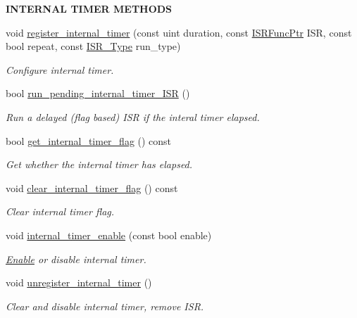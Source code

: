 \begin{Indent}{\bf I\+N\+T\+E\+R\+N\+AL T\+I\+M\+ER M\+E\+T\+H\+O\+DS}\par
\begin{DoxyCompactItemize}
\item 
void \hyperlink{class_loom___interrupt___manager_a61330d0a7d555fd77f0ecfa9e8d2d68e}{register\+\_\+internal\+\_\+timer} (const uint duration, const \hyperlink{_interrupt___manager_8h_a21adc8a9b6cc2505b5b1317ca9f74cf3}{I\+S\+R\+Func\+Ptr} I\+SR, const bool repeat, const \hyperlink{_interrupt___manager_8h_a1cb40265e710cbdf07f99beb6c4020d1}{I\+S\+R\+\_\+\+Type} run\+\_\+type)
\begin{DoxyCompactList}\small\item\em Configure internal timer. \end{DoxyCompactList}\item 
bool \hyperlink{class_loom___interrupt___manager_a62c7686cecf790cfa0b05b704dd331b7}{run\+\_\+pending\+\_\+internal\+\_\+timer\+\_\+\+I\+SR} ()
\begin{DoxyCompactList}\small\item\em Run a delayed (flag based) I\+SR if the interal timer elapsed. \end{DoxyCompactList}\item 
bool \hyperlink{class_loom___interrupt___manager_a0dce3fcaa0a20ebb67e6ff723cf6ac3d}{get\+\_\+internal\+\_\+timer\+\_\+flag} () const 
\begin{DoxyCompactList}\small\item\em Get whether the internal timer has elapsed. \end{DoxyCompactList}\item 
void \hyperlink{class_loom___interrupt___manager_acd8fc9dcdf5711155cde0b1ac6a3da15}{clear\+\_\+internal\+\_\+timer\+\_\+flag} () const 
\begin{DoxyCompactList}\small\item\em Clear internal timer flag. \end{DoxyCompactList}\item 
void \hyperlink{class_loom___interrupt___manager_a1264d1fc1bbb0d8c82e791d174e37007}{internal\+\_\+timer\+\_\+enable} (const bool enable)
\begin{DoxyCompactList}\small\item\em \hyperlink{namespace_enable}{Enable} or disable internal timer. \end{DoxyCompactList}\item 
void \hyperlink{class_loom___interrupt___manager_ac70690464b0311ad8758bf9cde3887d9}{unregister\+\_\+internal\+\_\+timer} ()
\begin{DoxyCompactList}\small\item\em Clear and disable internal timer, remove I\+SR. \end{DoxyCompactList}\end{DoxyCompactItemize}
\end{Indent}
